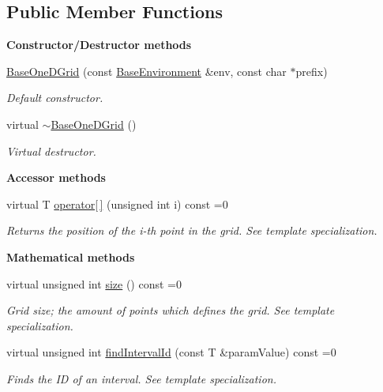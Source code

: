 \subsection*{Public Member Functions}
\begin{Indent}{\bf Constructor/\-Destructor methods}\par
\begin{DoxyCompactItemize}
\item 
\hyperlink{class_q_u_e_s_o_1_1_base_one_d_grid_a83cc4075f64e729df5ab6dbbe992c9fb}{Base\-One\-D\-Grid} (const \hyperlink{class_q_u_e_s_o_1_1_base_environment}{Base\-Environment} \&env, const char $\ast$prefix)
\begin{DoxyCompactList}\small\item\em Default constructor. \end{DoxyCompactList}\item 
virtual \hyperlink{class_q_u_e_s_o_1_1_base_one_d_grid_ae19c9434ea06d92100e8d49686e354e2}{$\sim$\-Base\-One\-D\-Grid} ()
\begin{DoxyCompactList}\small\item\em Virtual destructor. \end{DoxyCompactList}\end{DoxyCompactItemize}
\end{Indent}
\begin{Indent}{\bf Accessor methods}\par
\begin{DoxyCompactItemize}
\item 
virtual T \hyperlink{class_q_u_e_s_o_1_1_base_one_d_grid_a80648b45e665a5a10fec57e7ab094bce}{operator\mbox{[}$\,$\mbox{]}} (unsigned int i) const =0
\begin{DoxyCompactList}\small\item\em Returns the position of the i-\/th point in the grid. See template specialization. \end{DoxyCompactList}\end{DoxyCompactItemize}
\end{Indent}
\begin{Indent}{\bf Mathematical methods}\par
\begin{DoxyCompactItemize}
\item 
virtual unsigned int \hyperlink{class_q_u_e_s_o_1_1_base_one_d_grid_a388e922ba0c770039ab95e2cd1190dd6}{size} () const =0
\begin{DoxyCompactList}\small\item\em Grid size; the amount of points which defines the grid. See template specialization. \end{DoxyCompactList}\item 
virtual unsigned int \hyperlink{class_q_u_e_s_o_1_1_base_one_d_grid_ac238dee5e7ce70b93bbed696948c9df3}{find\-Interval\-Id} (const T \&param\-Value) const =0
\begin{DoxyCompactList}\small\item\em Finds the I\-D of an interval. See template specialization. \end{DoxyCompactList}\end{DoxyCompactItemize}
\end{Indent}
